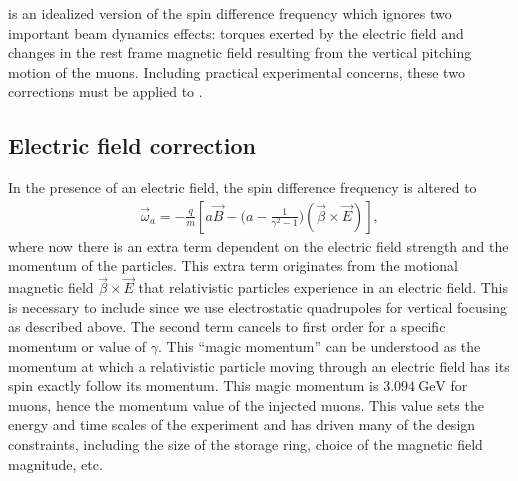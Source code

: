  is an idealized version of the spin difference frequency which ignores two important beam dynamics effects: torques exerted by the electric field and changes in the rest frame magnetic field resulting from the vertical pitching motion of the muons. Including practical experimental concerns, these two corrections must be applied to \wa.


\subsection{Electric field correction}
\label{sub:electric_field_correction}

In the presence of an electric field, the spin difference frequency is altered to 
        \begin{align} \label{eq:waelectric}
            \vec{\omega}_{a} = -\frac{q}{m} [a\vec{B} - \Big(a - \frac{1}{\gamma^{2}-1}\Big)(\vec{\beta} \times \vec{E}) ],
        \end{align}
where now there is an extra term dependent on the electric field strength and the momentum of the particles. This extra term originates from the motional magnetic field $\vec{\beta} \times \vec{E}$ that relativistic particles experience in an electric field. This is necessary to include since we use electrostatic quadrupoles for vertical focusing as described above.  The second term cancels to first order for a specific momentum or value of $\gamma$. This ``magic momentum'' can be understood as the momentum at which a relativistic particle moving through an electric field has its spin exactly follow its momentum. This magic momentum is $\SI{3.094}{\GeV}$ for muons, hence the momentum value of the injected muons. This value sets the energy and time scales of the experiment and has driven many of the design constraints, including the size of the storage ring, choice of the magnetic field magnitude, etc.

